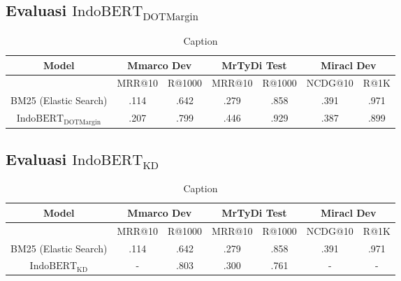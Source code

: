 \subsection{Evaluasi $\text{IndoBERT}_{\text{DOTMargin}}$}
\label{sec:resultindobertdotmargin}

\begin{table}
    \centering
    \caption{Caption}
    \label{tab:indobertdotmargin}
    \begin{tabular}{|c|cc|cc|cc|} \hline
        Model                                & \multicolumn{2}{|c|}{Mmarco Dev} &
        \multicolumn{2}{|c|}{MrTyDi Test}    & \multicolumn{2}{|c|}{Miracl Dev}                                             \\ \hline
                                             & MRR@10                           & R@1000 & MRR@10 & R@1000 & NCDG@10 & R@1K \\ \hline
        BM25 (Elastic Search)                & .114                             & .642   & .279   & .858   & .391    & .971 \\ \hline
        $\text{IndoBERT}_{\text{DOTMargin}}$ & .207                             & .799   & .446   & .929   & .387    & .899 \\ \hline
    \end{tabular}
\end{table}

\subsection{Evaluasi $\text{IndoBERT}_{\text{KD}}$}
\label{sec:resultindobertkd}

\begin{table}
    \centering
    \caption{Caption}
    \label{tab:indobertkd}
    \begin{tabular}{|c|cc|cc|cc|} \hline
        Model                             & \multicolumn{2}{|c|}{Mmarco Dev} &
        \multicolumn{2}{|c|}{MrTyDi Test} & \multicolumn{2}{|c|}{Miracl Dev}                                             \\ \hline
                                          & MRR@10                           & R@1000 & MRR@10 & R@1000 & NCDG@10 & R@1K \\ \hline
        BM25 (Elastic Search)             & .114                             & .642   & .279   & .858   & .391    & .971 \\ \hline
        $\text{IndoBERT}_{\text{KD}}$     & -                                & .803   & .300   & .761   & -       & -    \\ \hline
    \end{tabular}
\end{table}

